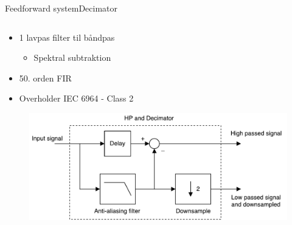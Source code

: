 \documentclass[10pt,aspectratio=169]{beamer}
\begin{document}
\begin{frame}{Feedforward system}{Decimator}
\begin{columns}
  \begin{column}{0.6\textwidth}
\begin{itemize}
\item 1 lavpas filter til båndpas
\begin{itemize}
\item Spektral subtraktion
\end{itemize}
\item 50. orden FIR
\item Overholder IEC 6964 - Class 2 
\end{itemize}
\begin{figure}
\centering
\includegraphics[width=\textwidth]{designRealDecimator}
\end{figure}
  \end{column}
\end{columns}
\end{frame}
\end{document}
